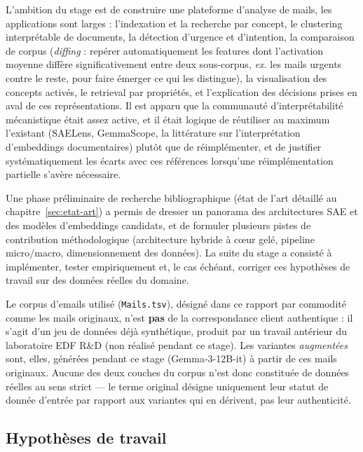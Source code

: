 \documentclass[11pt]{article}
\begin{document}
L'ambition du stage est de construire une plateforme d'analyse de
mails, les applications sont larges : l'indexation et la recherche par concept, le clustering
interprétable de documents, la détection d'urgence et d'intention, la
comparaison de corpus (\emph{diffing} : repérer automatiquement les features
dont l'activation moyenne diffère significativement entre deux sous-corpus,
\emph{ex.} les mails \og{}urgents\fg{} contre le reste, pour faire émerger ce
qui les distingue), la visualisation des concepts activés, le retrieval par
propriétés, et l'explication des décisions prises en aval de ces
représentations. Il est apparu que la communauté d'interprétabilité mécanistique était assez active, et il était logique de réutiliser au maximum
l'existant (SAELens, GemmaScope, la littérature sur l'interprétation
d'embeddings documentaires) plutôt que de réimplémenter, et de justifier
systématiquement les écarts avec ces références lorsqu'une réimplémentation
partielle s'avère nécessaire.

Une phase préliminaire de recherche bibliographique (état de l'art détaillé au
chapitre~\ref{sec:etat-art}) a permis de dresser un panorama des architectures
SAE et des modèles d'embeddings candidats, et de formuler plusieurs pistes de
contribution méthodologique (architecture hybride à cœur gelé, pipeline
micro/macro, dimensionnement des données). La suite du stage a consisté à
implémenter, tester empiriquement et, le cas échéant, corriger ces
hypothèses de travail sur des données réelles du domaine.

\begin{definitionbox}
Le corpus d'emails utilisé (\texttt{Mails.tsv}), désigné dans ce rapport par
commodité comme les mails \og{}originaux\fg{}, n'est \textbf{pas} de la
correspondance client authentique : il s'agit d'un jeu de données déjà
synthétique, produit par un travail antérieur du laboratoire EDF R\&D (non
réalisé pendant ce stage). Les variantes \emph{augmentées} sont, elles,
générées pendant ce stage (Gemma-3-12B-it) à partir de ces mails
\og{}originaux\fg{}. Aucune des deux couches du corpus n'est donc constituée
de données réelles au sens strict --- le terme \og{}original\fg{} désigne
uniquement leur statut de donnée d'entrée par rapport aux variantes qui en
dérivent, pas leur authenticité.
\end{definitionbox}

\subsection{Hypothèses de travail}
\end{document}

